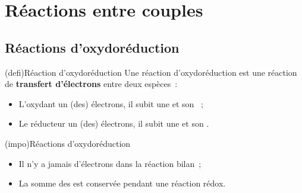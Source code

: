 \documentclass[../../main/main.tex]{subfiles}
\begin{document}
\section{Réactions entre couples}
\subsection{Réactions d'oxydoréduction}
\begin{tcb*}[breakable](defi){Réaction d'oxydoréduction}
	Une réaction d'oxydoréduction est une réaction de \textbf{transfert
		d'électrons} entre deux espèces~:
	\psw{
		\[
			\ce{Ox_1 + Red_2 = Red_1 + Ox_2}
		\]
	}
	\vspace{-25pt}
	\begin{itemize}
		\item L'oxydant  un (des) électrons, il subit une
		       et son \no {}~;
		\item Le réducteur  un (des) électrons, il subit une
		       et son \no {}.
	\end{itemize}
\end{tcb*}

\begin{tcb*}(impo){Réactions d'oxydoréduction}
	\begin{itemize}
		\item Il n'y a jamais d'électrons dans la réaction bilan~;
		\item La somme des \no est conservée pendant une réaction rédox.
	\end{itemize}
\end{tcb*}
\end{document}
